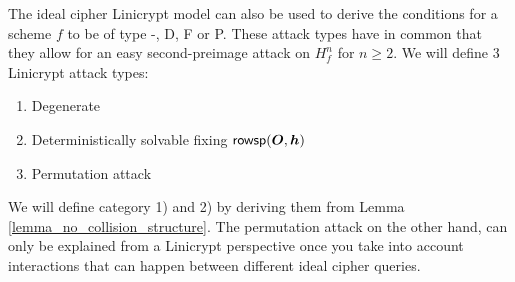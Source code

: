 The ideal cipher Linicrypt model can also be used to derive the conditions for a scheme $f$ to be of type -, D, F or P. 
These attack types have in common that they allow for an easy second-preimage attack on $H^n_f$ for $n \geq 2$.
We will define 3 Linicrypt attack types:
\begin{enumerate}
\item Degenerate
\item Deterministically solvable fixing $\mathsf{rowsp}(\boldsymbol{O}, \boldsymbol h)$
\item Permutation attack
\end{enumerate}
We will define category 1) and 2) by deriving them from Lemma \ref{lemma_no_collision_structure}.
The permutation attack on the other hand, can only be explained from a Linicrypt perspective
once you take into account interactions that can happen between different ideal cipher queries.

